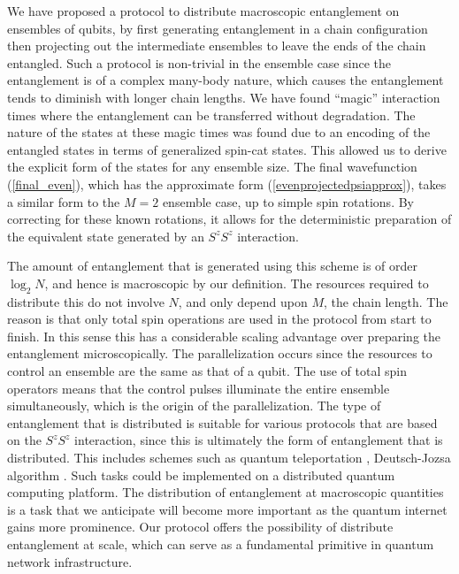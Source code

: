 \documentclass[%
  prx,%
  twocolumn,%
  preprintnumbers,%
  amsmath,%
  amssymb,%
  superscriptaddress%
]{revtex4}
\begin{document}
We have proposed a protocol to distribute macroscopic entanglement on ensembles of qubits, by first generating entanglement in a chain configuration then projecting out the intermediate ensembles to leave the ends of the chain entangled.  Such a protocol is non-trivial in the ensemble case since the entanglement is of a complex many-body nature, which causes the entanglement tends to diminish with longer chain lengths.  We have found ``magic'' interaction times where the entanglement can be transferred without degradation.  The nature of the states at these magic times was found due to an encoding of the entangled states in terms of generalized spin-cat states.  This allowed us to derive the explicit form of the states for any ensemble size. The final wavefunction (\ref{final_even}), which has the approximate form (\ref{evenprojectedpsiapprox}), takes a similar form to the $ M = 2 $ ensemble case, up to simple spin rotations.  By correcting for these known rotations, it allows for the deterministic preparation of the equivalent state generated by an $ S^z S^z $ interaction.  

The amount of entanglement that is generated using this scheme is of order $ \log_2 N$, and hence is macroscopic by our definition.   The resources required to distribute this do not involve $ N $, and only depend upon $ M $, the chain length.  The reason is that only total spin operations are used in the protocol from start to finish. In this sense this has a considerable scaling advantage over preparing the entanglement microscopically.  The parallelization occurs since the resources to control an ensemble are the same as that of a qubit. The use of total spin operators means that the control pulses illuminate the entire ensemble simultaneously, which is the origin of the parallelization.  The type of entanglement that is distributed is suitable for various protocols that are based on the $ S^z S^z $ interaction, since this is ultimately the form of entanglement that is distributed.  This includes schemes such as quantum teleportation \cite{pyrkov2014quantum,pyrkov2014full}, Deutsch-Jozsa algorithm \cite{semenenko2016implementing}. Such tasks could be implemented on a distributed quantum computing platform.  The distribution of entanglement at macroscopic quantities is a task that we anticipate will become more important as the quantum internet gains more prominence.  Our protocol offers the possibility of distribute entanglement at scale, which can serve as a fundamental primitive in quantum network infrastructure.  
\end{document}
